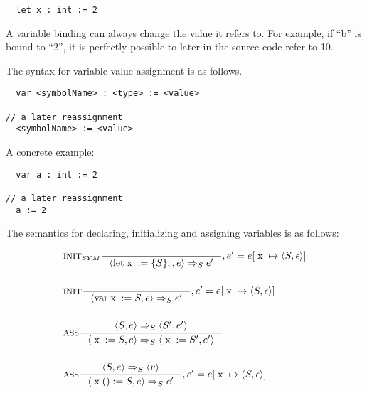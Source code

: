 \begin{verbatim}
  let x : int := 2
\end{verbatim}

A variable binding can always change the value it refers to. For example, if \enquote{b} is bound to \enquote{2}, it is perfectly possible to later in the source code refer to {10}.

The syntax for variable value assignment is as follows.

\begin{verbatim}
  var <symbolName> : <type> := <value>

// a later reassignment
  <symbolName> := <value>
\end{verbatim}
A concrete example:

\begin{verbatim}
  var a : int := 2
  
// a later reassignment
  a := 2
\end{verbatim}

The semantics for declaring, initializing and assigning variables is as follows:

\begin{align*}
&\inference[$\text{INIT}_{SYM}$]{}
                         {\Braket{\Tlet \Tx := \{S\};,e} \Rightarrow_S e'}
												 {, e' = e[\Tx \mapsto \Braket{S,\epsilon}]}
\\\\
&\inference[$\text{INIT}$]{}
                         {\Braket{\Tvar \Tx := S,e} \Rightarrow_S e'}
												 {, e' = e[\Tx \mapsto \Braket{S,\epsilon}]}
\\\\
&\inference[ASS]{\Braket{S,e} \Rightarrow_S \Braket{S',e'}}
                 {\Braket{\Tx := S,e} \Rightarrow_S \Braket{\Tx := S',e'}}
\\\\
&\inference[ASS]{\Braket{S,e} \Rightarrow_S \Braket{v}}
                 {\Braket{\Tx() := S,e} \Rightarrow_S e'}
								 {, e' = e[\Tx \mapsto \Braket{S,\epsilon}]}
\end{align*}